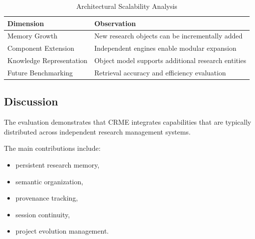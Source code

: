 \begin{table}[t]

\caption{Architectural Scalability Analysis}

\label{tab:scalability_analysis}


\centering
\small


\begin{tabular}{ll}

\toprule

Dimension &
Observation
\\

\midrule


Memory Growth &
New research objects can be incrementally added
\\


Component Extension &
Independent engines enable modular expansion
\\


Knowledge Representation &
Object model supports additional research entities
\\


Future Benchmarking &
Retrieval accuracy and efficiency evaluation
\\


\bottomrule


\end{tabular}


\end{table}





\subsection{Discussion}


The evaluation demonstrates that CRME integrates capabilities that
are typically distributed across independent research management
systems.

The main contributions include:


\begin{itemize}


\item persistent research memory,

\item semantic organization,

\item provenance tracking,

\item session continuity,

\item project evolution management.


\end{itemize}


